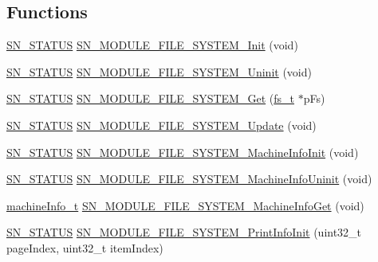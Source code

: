 \subsection*{Functions}
\begin{DoxyCompactItemize}
\item 
\hyperlink{group__SYSTEM__ERROR_ga4540713b9a7a18ce44d78c3a10f7442f}{S\+N\+\_\+\+S\+T\+A\+T\+US} \hyperlink{group__MODULE__FILE__SYSTEM_ga4b8101916d7de3e4d3004b79f4c8c2de}{S\+N\+\_\+\+M\+O\+D\+U\+L\+E\+\_\+\+F\+I\+L\+E\+\_\+\+S\+Y\+S\+T\+E\+M\+\_\+\+Init} (void)
\item 
\hyperlink{group__SYSTEM__ERROR_ga4540713b9a7a18ce44d78c3a10f7442f}{S\+N\+\_\+\+S\+T\+A\+T\+US} \hyperlink{group__MODULE__FILE__SYSTEM_ga39c0e153f169cc6bdb35bce4d2a9194b}{S\+N\+\_\+\+M\+O\+D\+U\+L\+E\+\_\+\+F\+I\+L\+E\+\_\+\+S\+Y\+S\+T\+E\+M\+\_\+\+Uninit} (void)
\item 
\hyperlink{group__SYSTEM__ERROR_ga4540713b9a7a18ce44d78c3a10f7442f}{S\+N\+\_\+\+S\+T\+A\+T\+US} \hyperlink{group__MODULE__FILE__SYSTEM_gadfe4c4eeb9c662e30893824357bc46a5}{S\+N\+\_\+\+M\+O\+D\+U\+L\+E\+\_\+\+F\+I\+L\+E\+\_\+\+S\+Y\+S\+T\+E\+M\+\_\+\+Get} (\hyperlink{structfile__system}{fs\+\_\+t} $\ast$p\+Fs)
\item 
\hyperlink{group__SYSTEM__ERROR_ga4540713b9a7a18ce44d78c3a10f7442f}{S\+N\+\_\+\+S\+T\+A\+T\+US} \hyperlink{group__MODULE__FILE__SYSTEM_ga7df4490475224028341c54f5d5db5736}{S\+N\+\_\+\+M\+O\+D\+U\+L\+E\+\_\+\+F\+I\+L\+E\+\_\+\+S\+Y\+S\+T\+E\+M\+\_\+\+Update} (void)
\item 
\hyperlink{group__SYSTEM__ERROR_ga4540713b9a7a18ce44d78c3a10f7442f}{S\+N\+\_\+\+S\+T\+A\+T\+US} \hyperlink{group__MODULE__FILE__SYSTEM_ga4fba82e15bc9a77407cacaa1a6aadd50}{S\+N\+\_\+\+M\+O\+D\+U\+L\+E\+\_\+\+F\+I\+L\+E\+\_\+\+S\+Y\+S\+T\+E\+M\+\_\+\+Machine\+Info\+Init} (void)
\item 
\hyperlink{group__SYSTEM__ERROR_ga4540713b9a7a18ce44d78c3a10f7442f}{S\+N\+\_\+\+S\+T\+A\+T\+US} \hyperlink{group__MODULE__FILE__SYSTEM_ga86125af6adcd6218d4ebdb484e11d273}{S\+N\+\_\+\+M\+O\+D\+U\+L\+E\+\_\+\+F\+I\+L\+E\+\_\+\+S\+Y\+S\+T\+E\+M\+\_\+\+Machine\+Info\+Uninit} (void)
\item 
\hyperlink{structmachine__information}{machine\+Info\+\_\+t} \hyperlink{group__MODULE__FILE__SYSTEM_ga647e18cfc2415cb546d69b327ed76232}{S\+N\+\_\+\+M\+O\+D\+U\+L\+E\+\_\+\+F\+I\+L\+E\+\_\+\+S\+Y\+S\+T\+E\+M\+\_\+\+Machine\+Info\+Get} (void)
\item 
\hyperlink{group__SYSTEM__ERROR_ga4540713b9a7a18ce44d78c3a10f7442f}{S\+N\+\_\+\+S\+T\+A\+T\+US} \hyperlink{group__MODULE__FILE__SYSTEM_gadbd5aafed31faed399abd08193a04bc8}{S\+N\+\_\+\+M\+O\+D\+U\+L\+E\+\_\+\+F\+I\+L\+E\+\_\+\+S\+Y\+S\+T\+E\+M\+\_\+\+Print\+Info\+Init} (uint32\+\_\+t page\+Index, uint32\+\_\+t item\+Index)

\end{DoxyCompactItemize}
